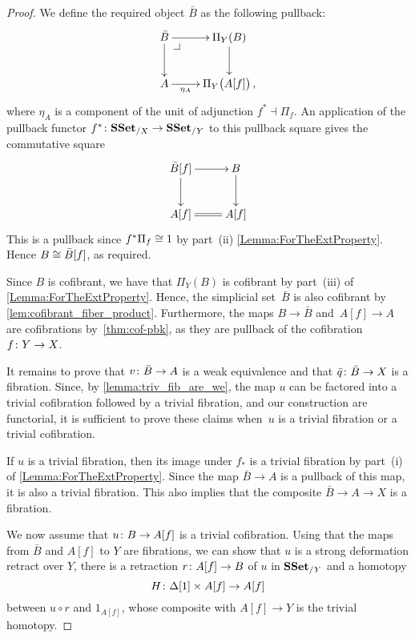 \documentclass[reqno,10pt,a4paper,oneside,draft]{amsart}
\begin{document}
\begin{proof} We define the required object $\bar{B}$ as the following pullback:
\[\xymatrix{
\bar{B} \ar[d] \ar[r] \drpullback & \Pi_Y(B) \ar[d] \\
A \ar[r]_-{\eta_{A}} & \Pi_Y \big( A[f]  \big) \, ,
}\]
where $\eta_{A}$ is  a component of the unit of adjunction  $f^* \dashv \Pi_f$. An application of the pullback functor $f^* \colon \mathbf{SSet}_{/X} \to \mathbf{SSet}_{/Y}$ to this pullback square gives the commutative square
\[\xymatrix{
\bar{B}[f] \ar[d] \ar[r]  & B \ar[d] \\
A[f] \ar@{=}[r] &A[f] 
}\]
This is a pullback since $f^* \Pi_f \cong 1$ by part~(ii) \cref{Lemma:ForTheExtProperty}. Hence 
$B \cong \bar{B}[f]$, as required.


Since $B$ is cofibrant, we have that $\Pi_Y(B)$ is cofibrant by part~(iii) of  \cref{Lemma:ForTheExtProperty}. Hence, the simplicial set~$\bar{B}$  is also cofibrant by \cref{lem:cofibrant_fiber_product}. Furthermore, the maps $B \rightarrow \bar{B}$ and~$A[f] \rightarrow A$ are cofibrations by~\cref{thm:cof-pbk}, as they are pullback of the cofibration~$f \colon Y \rightarrow X$.





It remains to prove that $v \colon \bar{B} \rightarrow A$ is a weak equivalence and that 
$\bar{q} \colon \bar{B} \rightarrow X$ is a fibration. Since, by \cref{lemma:triv_fib_are_we}, the map $u$ can be factored into a trivial cofibration followed by a trivial fibration, and our construction are functorial, it is sufficient to prove these claims when~$u$ is a trivial fibration or a trivial cofibration.

If $u$ is a trivial fibration, then its image under $f_*$ is a trivial fibration by 
part~(i) of \cref{Lemma:ForTheExtProperty}. Since the map $\bar{B} \rightarrow A$ is a pullback of this map,
it is also a trivial fibration. This also implies that the composite $\bar{B} \rightarrow A \rightarrow X$ is a fibration.


We now assume that $u \colon B \rightarrow A[f]$ is a trivial cofibration. Using that the maps from $\bar{B}$ and $A[f]$ to $Y$ are fibrations, we can show that $u$ is a strong deformation retract over $Y$, \ie there is a retraction $r \colon A[f] \rightarrow B$ of $u$ in $\mathbf{SSet}_{/Y}$ and a homotopy 
\[
H \colon \Delta[1] \times A[f] \rightarrow A[f]
\] 
between 
$u \circ r$ and $1_{A[f]}$, whose composite with $A[f] \rightarrow Y$ is the trivial homotopy.


\end{proof}
\end{document}
